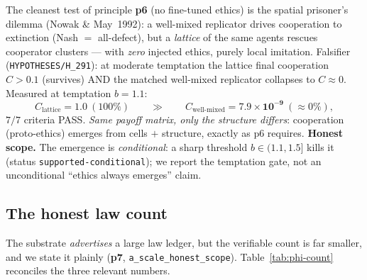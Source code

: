 The cleanest test of principle \textbf{p6} (no fine-tuned ethics) is the
spatial prisoner's dilemma (Nowak \& May~1992): a well-mixed replicator drives
cooperation to extinction (Nash $=$ all-defect), but a \emph{lattice} of the
same agents rescues cooperator clusters --- with \emph{zero} injected ethics,
purely local imitation. Falsifier (\texttt{HYPOTHESES/H\_291}): at moderate
temptation the lattice final cooperation $C>0.1$ (survives) AND the matched
well-mixed replicator collapses to $C\approx0$. Measured at temptation $b=1.1$:
\begin{equation}
C_\text{lattice} = \mathbf{1.0}\ (100\%)
\qquad\gg\qquad
C_\text{well-mixed} = \mathbf{7.9\times10^{-9}}\ (\approx0\%),
\label{eq:ethics}
\end{equation}
$7/7$ criteria PASS. \emph{Same payoff matrix, only the structure differs}:
cooperation (proto-ethics) emerges from cells $+$ structure, exactly as p6
requires. \textbf{Honest scope.} The emergence is \emph{conditional}: a sharp
threshold $b\in(1.1,1.5]$ kills it (status \texttt{supported-conditional}); we
report the temptation gate, not an unconditional ``ethics always emerges'' claim.

\subsection{The honest law count}
\label{app:phi-count}

The substrate \emph{advertises} a large law ledger, but the verifiable count is
far smaller, and we state it plainly (\textbf{p7},
\texttt{a\_scale\_honest\_scope}). Table~\ref{tab:phi-count} reconciles the
three relevant numbers.

